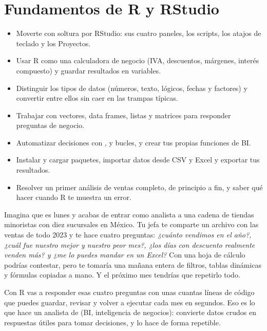 \chapter{Fundamentos de R y RStudio}
\label{cap:fundamentos}

\begin{objetivos}
\begin{itemize}
  \item Moverte con soltura por RStudio: sus cuatro paneles, los scripts, los
        atajos de teclado y los Proyectos.
  \item Usar R como una calculadora de negocio (IVA, descuentos, márgenes,
        interés compuesto) y guardar resultados en variables.
  \item Distinguir los tipos de datos (números, texto, lógicos, fechas y
        factores) y convertir entre ellos sin caer en las trampas típicas.
  \item Trabajar con vectores, data frames, listas y matrices para responder
        preguntas de negocio.
  \item Automatizar decisiones con ,  y bucles, y
        crear tus propias funciones de BI.
  \item Instalar y cargar paquetes, importar datos desde CSV y Excel y
        exportar tus resultados.
  \item Resolver un primer análisis de ventas completo, de principio a fin,
        y saber qué hacer cuando R te muestra un error.
\end{itemize}
\end{objetivos}

Imagina que es lunes y acabas de entrar como analista a una cadena de tiendas
minoristas con diez sucursales en México. Tu jefa te comparte un archivo con
las ventas de todo 2023 y te hace cuatro preguntas: \emph{¿cuánto vendimos en
el año?, ¿cuál fue nuestro mejor y nuestro peor mes?, ¿los días con descuento
realmente venden más? y ¿me lo puedes mandar en un Excel?} Con una hoja de
cálculo podrías contestar, pero te tomaría una mañana entera de filtros, tablas
dinámicas y fórmulas copiadas a mano. Y el próximo mes tendrías que repetirlo
todo.

Con R vas a responder esas cuatro preguntas con unas cuantas líneas de código
que puedes guardar, revisar y volver a ejecutar cada mes en segundos. Eso es
lo que hace un analista de  (BI, inteligencia
de negocios): convierte datos crudos en respuestas útiles para tomar
decisiones, y lo hace de forma repetible.

